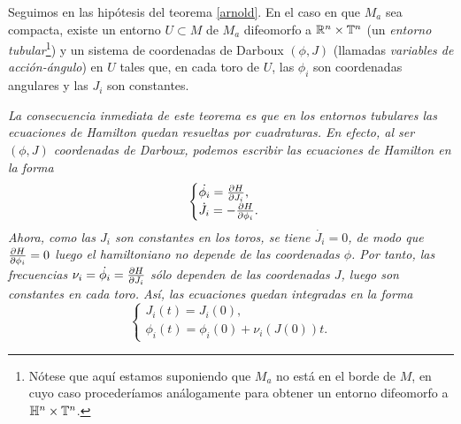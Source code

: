  \begin{thm}
   Seguimos en las hipótesis del teorema \ref{arnold}. En el caso en que $M_a$ sea compacta, existe un entorno $U\subset M$ de $M_a$ difeomorfo a $\mathbb{R}^n \times \mathbb{T}^n$ (un \emph{entorno tubular}\footnote{Nótese que aquí estamos suponiendo que $M_a$ no está en el borde de $M$, en cuyo caso procederíamos análogamente para obtener un entorno difeomorfo a $\mathbb{H}^n \times \mathbb{T}^n$.})
 y un sistema de coordenadas de Darboux $(\phi,J)$ (llamadas \emph{variables de acción-ángulo}) en $U$ tales que, en cada toro de $U$, las $\phi_i$ son coordenadas angulares y las $J_i$ son constantes. 
  \end{thm}

  \begin{obs}
    \em
    La consecuencia inmediata de este teorema es que en los entornos tubulares las ecuaciones de Hamilton quedan resueltas por cuadraturas. En efecto, al ser $(\phi,J)$ coordenadas de Darboux, podemos escribir las ecuaciones de Hamilton en la forma
    \begin{equation*}
      \begin{cases}
	\dot{\phi_i}=\frac{\partial H}{\partial J_i}, \\ 
	\dot{J_i}=-\frac{\partial H}{\partial \phi_i}.
      \end{cases}
    \end{equation*}
    Ahora, como las $J_i$ son constantes en los toros, se tiene $\dot{J_i}=0$, de modo que $\frac{\partial H}{\partial \phi_i}=0$ luego el hamiltoniano no depende de las coordenadas $\phi$. Por tanto, las frecuencias $\nu_i=\dot{\phi_i}=\frac{\partial H}{\partial J_i}$ sólo dependen de las coordenadas $J$, luego son constantes en cada toro. Así, las ecuaciones quedan integradas en la forma
    \begin{equation*}
      \begin{cases}
	J_i(t)=J_i(0), \\
	\phi_i(t)=\phi_i(0)+\nu_i(J(0)) t. 
      \end{cases}
    \end{equation*}
  \end{obs}

